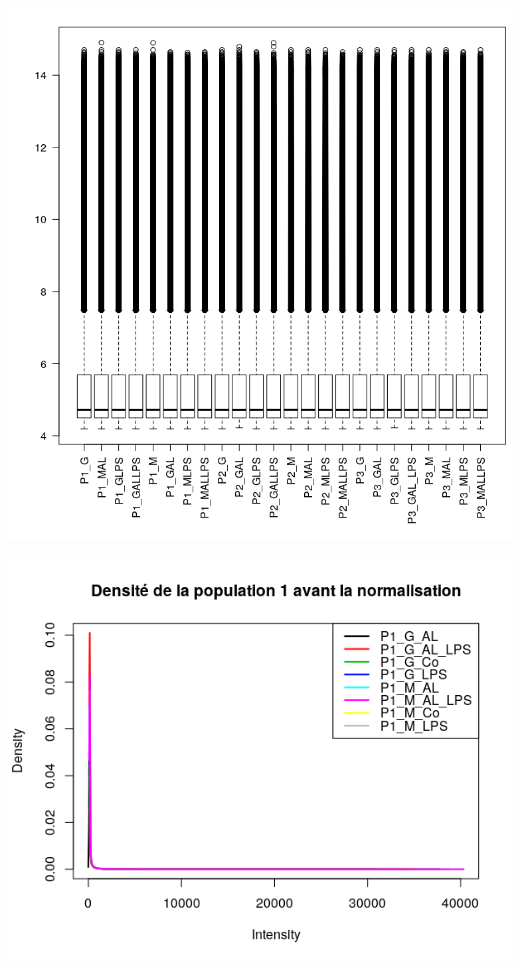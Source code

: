 \documentclass[a4paper,10pt]{article}
\begin{document}
\begin{center}
 \includegraphics[scale=0.5]{../../R/output/boxplotAfterNorm.png}
\end{center}
\begin{center}
 \includegraphics[scale=0.5]{../../R/output/Densitypop1.png}
\end{center}
\end{document}
